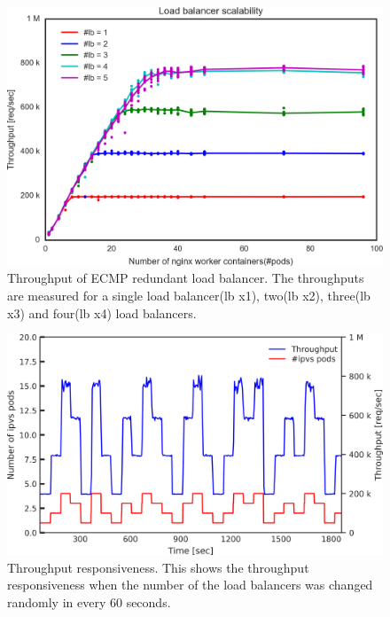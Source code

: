 \begin{figure}[h]
  \centering
  \includegraphics[width=0.8\columnwidth,left]{Figs/ecmp_lb_cubic}
  \par\bigskip
  \centering
  \begin{minipage}{0.8\columnwidth}
        \caption[Throughput of ECMP redundant load balancer]{
          Throughput of ECMP redundant load balancer.
          The throughputs are measured for a single load balancer(lb x1), two(lb x2), three(lb x3) and four(lb x4) load balancers.
        }
  \end{minipage}
  \label{fig:ecmp_lb_cubic}
\end{figure}

\begin{figure}[h]
  \centering
  \includegraphics[width=0.8\columnwidth,left]{Figs/ecmp_response}
  \par\bigskip
  \centering
  \begin{minipage}{0.8\columnwidth}
    \caption[Throughput responsiveness]{
      Throughput responsiveness.
      This shows the throughput responsiveness when the number of the load balancers was changed randomly in every 60 seconds.
    }
  \end{minipage}
  \label{fig:ecmp_response}
\end{figure}


